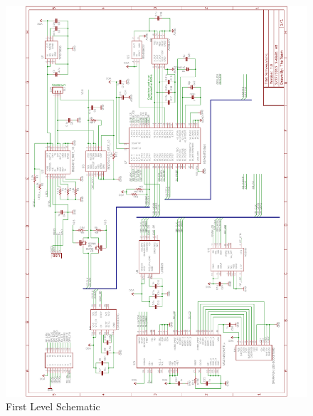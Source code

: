 \begin{figure}[H]
\centering
	\includegraphics[width=\textwidth]{img/FirstLevelSchematics}
	\caption{First Level Schematic \label{fig:firstLevel}}
\end{figure}

